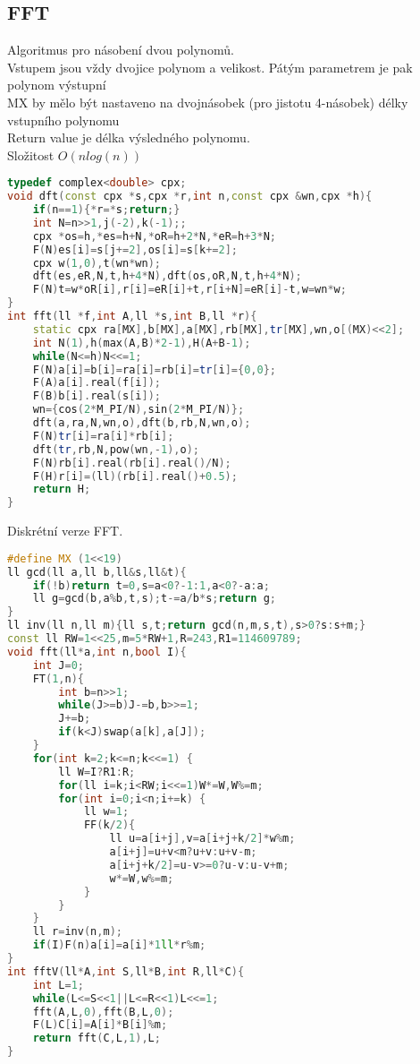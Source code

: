 \documentclass[11pt]{article}
\begin{document}
\subsection{FFT}
Algoritmus pro násobení dvou polynomů.
\\Vstupem jsou vždy dvojice polynom a velikost. Pátým parametrem je pak polynom výstupní
\\MX by mělo být nastaveno na dvojnásobek (pro jistotu 4-násobek) délky vstupního polynomu
\\Return value je délka výsledného polynomu.
\\Složitost $O(nlog(n))$
\begin{lstlisting}[language=C++]
typedef complex<double> cpx;
void dft(const cpx *s,cpx *r,int n,const cpx &wn,cpx *h){
    if(n==1){*r=*s;return;}
    int N=n>>1,j(-2),k(-1);;
    cpx *os=h,*es=h+N,*oR=h+2*N,*eR=h+3*N;
    F(N)es[i]=s[j+=2],os[i]=s[k+=2];
    cpx w(1,0),t(wn*wn);
    dft(es,eR,N,t,h+4*N),dft(os,oR,N,t,h+4*N);
    F(N)t=w*oR[i],r[i]=eR[i]+t,r[i+N]=eR[i]-t,w=wn*w;
}
int fft(ll *f,int A,ll *s,int B,ll *r){
    static cpx ra[MX],b[MX],a[MX],rb[MX],tr[MX],wn,o[(MX)<<2];
    int N(1),h(max(A,B)*2-1),H(A+B-1);
    while(N<=h)N<<=1;
    F(N)a[i]=b[i]=ra[i]=rb[i]=tr[i]={0,0};
    F(A)a[i].real(f[i]);
    F(B)b[i].real(s[i]);
    wn={cos(2*M_PI/N),sin(2*M_PI/N)};
    dft(a,ra,N,wn,o),dft(b,rb,N,wn,o);
    F(N)tr[i]=ra[i]*rb[i];
    dft(tr,rb,N,pow(wn,-1),o);
    F(N)rb[i].real(rb[i].real()/N);
    F(H)r[i]=(ll)(rb[i].real()+0.5);
    return H;
}
\end{lstlisting}
Diskrétní verze FFT.
\begin{lstlisting}[language=C++]
#define MX (1<<19)
ll gcd(ll a,ll b,ll&s,ll&t){
    if(!b)return t=0,s=a<0?-1:1,a<0?-a:a;
    ll g=gcd(b,a%b,t,s);t-=a/b*s;return g; 
}
ll inv(ll n,ll m){ll s,t;return gcd(n,m,s,t),s>0?s:s+m;}
const ll RW=1<<25,m=5*RW+1,R=243,R1=114609789;
void fft(ll*a,int n,bool I){
    int J=0;
    FT(1,n){
        int b=n>>1;
        while(J>=b)J-=b,b>>=1;
        J+=b;
        if(k<J)swap(a[k],a[J]);
    }
    for(int k=2;k<=n;k<<=1) {
        ll W=I?R1:R;
        for(ll i=k;i<RW;i<<=1)W*=W,W%=m;
        for(int i=0;i<n;i+=k) {
            ll w=1;
            FF(k/2){
                ll u=a[i+j],v=a[i+j+k/2]*w%m;
                a[i+j]=u+v<m?u+v:u+v-m;
                a[i+j+k/2]=u-v>=0?u-v:u-v+m;
                w*=W,w%=m;
            }
        }
    }
    ll r=inv(n,m);
    if(I)F(n)a[i]=a[i]*1ll*r%m;
}
int fftV(ll*A,int S,ll*B,int R,ll*C){
    int L=1;
    while(L<=S<<1||L<=R<<1)L<<=1;
    fft(A,L,0),fft(B,L,0);
    F(L)C[i]=A[i]*B[i]%m;
    return fft(C,L,1),L;
}
\end{lstlisting}
\end{document}
